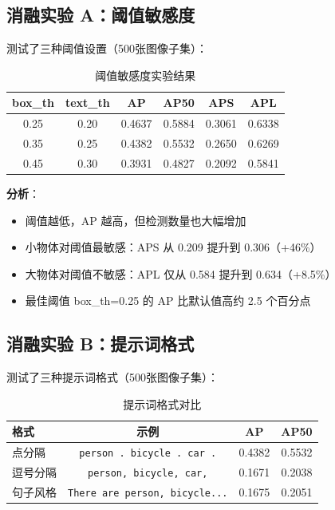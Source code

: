 \documentclass[12pt,a4paper]{ctexart}
\begin{document}
\subsection{消融实验 A：阈值敏感度}

测试了三种阈值设置（500张图像子集）：

\begin{table}[H]
    \centering
    \caption{阈值敏感度实验结果}
    \small
    \begin{tabular}{cccccc}
        \toprule
        \textbf{box\_th} & \textbf{text\_th} & \textbf{AP} & \textbf{AP50} & \textbf{APS} & \textbf{APL} \\
        \midrule
        0.25 & 0.20 & 0.4637 & 0.5884 & 0.3061 & 0.6338 \\
        0.35 & 0.25 & 0.4382 & 0.5532 & 0.2650 & 0.6269 \\
        0.45 & 0.30 & 0.3931 & 0.4827 & 0.2092 & 0.5841 \\
        \bottomrule
    \end{tabular}
\end{table}

\textbf{分析}：
\begin{itemize}
    \item 阈值越低，AP 越高，但检测数量也大幅增加
    \item 小物体对阈值最敏感：APS 从 0.209 提升到 0.306（+46\%）
    \item 大物体对阈值不敏感：APL 仅从 0.584 提升到 0.634（+8.5\%）
    \item 最佳阈值 box\_th=0.25 的 AP 比默认值高约 2.5 个百分点
\end{itemize}

\subsection{消融实验 B：提示词格式}

测试了三种提示词格式（500张图像子集）：

\begin{table}[H]
    \centering
    \caption{提示词格式对比}
    \small
    \begin{tabular}{lccc}
        \toprule
        \textbf{格式} & \textbf{示例} & \textbf{AP} & \textbf{AP50} \\
        \midrule
        点分隔 & \texttt{person . bicycle . car .} & 0.4382 & 0.5532 \\
        逗号分隔 & \texttt{person, bicycle, car,} & 0.1671 & 0.2038 \\
        句子风格 & \texttt{There are person, bicycle...} & 0.1675 & 0.2051 \\
        \bottomrule
    \end{tabular}
\end{table}
\end{document}

